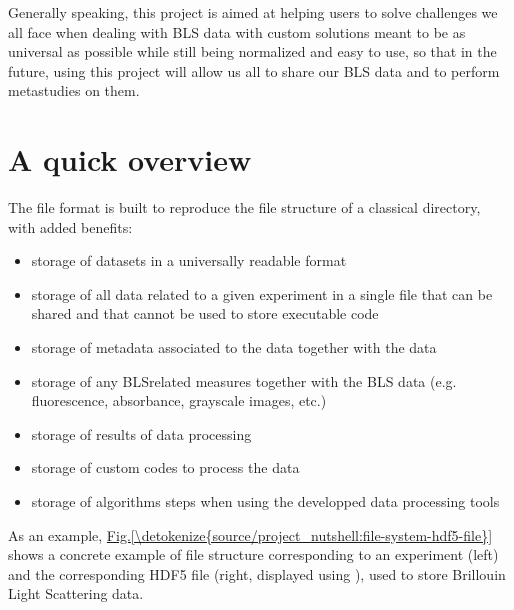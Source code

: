 \documentclass[letterpaper,10pt,english]{sphinxmanual}
\begin{document}
\sphinxAtStartPar
Generally speaking, this project is aimed at helping users to solve challenges we all face when dealing with BLS data with custom solutions meant to be as universal as possible while still being normalized and easy to use, so that in the future, using this project will allow us all to share our BLS data and to perform meta\sphinxhyphen{}studies on them.


\section{A quick overview}
\label{\detokenize{source/project_nutshell:a-quick-overview}}
\sphinxAtStartPar
The file format is built to reproduce the file structure of a classical directory, with added benefits:
\begin{itemize}
\item {} 
\sphinxAtStartPar
storage of datasets in a universally readable format

\item {} 
\sphinxAtStartPar
storage of all data related to a given experiment in a single file that can be shared and that cannot be used to store executable code

\item {} 
\sphinxAtStartPar
storage of metadata associated to the data together with the data

\item {} 
\sphinxAtStartPar
storage of any BLS\sphinxhyphen{}related measures together with the BLS data (e.g. fluorescence, absorbance, grayscale images, etc.)

\item {} 
\sphinxAtStartPar
storage of results of data processing

\item {} 
\sphinxAtStartPar
storage of custom codes to process the data

\item {} 
\sphinxAtStartPar
storage of algorithms steps when using the developped data processing tools

\end{itemize}

\sphinxAtStartPar
As an example, \hyperref[\detokenize{source/project_nutshell:file-system-hdf5-file}]{Fig.\@ \ref{\detokenize{source/project_nutshell:file-system-hdf5-file}}} shows a concrete example of file structure corresponding to an experiment (left) and the corresponding HDF5 file (right, displayed using ), used to store Brillouin Light Scattering data.
\end{document}
